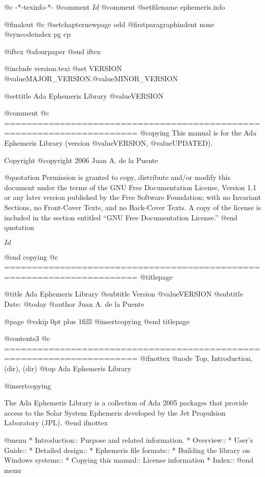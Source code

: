    @c -*-texinfo-*-
@comment $Id$
@comment %
@setfilename ephemeris.info

@finalout
@c @setchapternewpage odd
@firstparagraphindent none
@syncodeindex pg cp

@iftex
@afourpaper
@end iftex

@include version.texi
@set VERSION @value{MAJOR_VERSION}.@value{MINOR_VERSION}

@settitle Ada Ephemeris Library @value{VERSION}

@comment %
@c ======================================================================
@copying
This manual is for the Ada Ephemeris Library (version @value{VERSION},
@value{UPDATED}).

Copyright @copyright{} 2006 Juan A. de la Puente

@quotation
Permission is granted to copy, distribute and/or modify this document
under the terms of the GNU Free Documentation License, Version 1.1 or
any later version published by the Free Software Foundation; with no
Invariant Sections, no Front-Cover Texts, and no Back-Cover Texts.  A
copy of the license is included in the section entitled ``GNU Free
Documentation License.''
@end quotation

$Id$

@end copying
@c ======================================================================
@titlepage

@title Ada Ephemeris Library
@subtitle Version @value{VERSION}
@subtitle Date: @today{}
@author Juan A. de la Puente

@page
@vskip 0pt plus 1filll
@insertcopying
@end titlepage

@contents3
@c ======================================================================
@ifnottex
@node Top, Introduction, (dir), (dir)
@top Ada Ephemeris Library

@insertcopying

The Ada Ephemeris Library is a collection of Ada 2005 packages that
provide access to the Solar System Ephemeris developed by the
Jet Propulsion Laboratory (JPL).
@end ifnottex

@menu
* Introduction::                Purpose and related information.
* Overview::                    
* User's Guide::                
* Detailed design::             
* Ephemeris file formats::      
* Building the library on Windows systems::  
* Copying this manual::         License information
* Index::                       
@end menu

